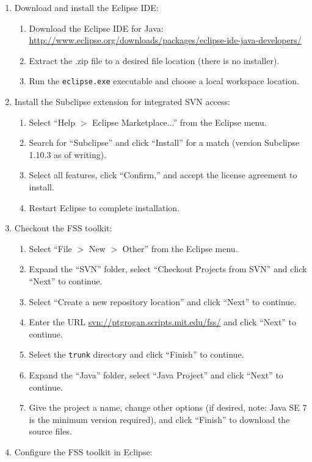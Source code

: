\documentclass[]{article}
\begin{document}
\begin{enumerate}
\item Download and install the Eclipse IDE:
\begin{enumerate}
\item Download the Eclipse IDE for Java: \\ \url{http://www.eclipse.org/downloads/packages/eclipse-ide-java-developers/}
\item Extract the .zip file to a desired file location (there is no installer).
\item Run the \texttt{eclipse.exe} executable and choose a local workspace location.
\end{enumerate}
\item Install the Subclipse extension for integrated SVN access:
\begin{enumerate}
\item Select ``Help $>$ Eclipse Marketplace...'' from the Eclipse menu.
\item Search for ``Subclipse'' and click ``Install'' for a match (version Subclipse 1.10.3 as of writing).
\item Select all features, click ``Confirm,'' and accept the license agreement to install.
\item Restart Eclipse to complete installation.
\end{enumerate}
\item Checkout the FSS toolkit:
\begin{enumerate}
\item Select ``File $>$ New $>$ Other'' from the Eclipse menu.
\item Expand the ``SVN'' folder, select ``Checkout Projects from SVN'' and click ``Next'' to continue.
\item Select ``Create a new repository location'' and click ``Next'' to continue.
\item Enter the URL \url{svn://ptgrogan.scripts.mit.edu/fss/} and click ``Next'' to continue.
\item Select the \texttt{trunk} directory and click ``Finish'' to continue.
\item Expand the ``Java'' folder, select ``Java Project'' and click ``Next'' to continue.
\item Give the project a name, change other options (if desired, note: Java SE 7 is the minimum version required), and click ``Finish'' to download the source files.
\end{enumerate}
\item Configure the FSS toolkit in Eclipse:

\end{enumerate}
\end{document}
